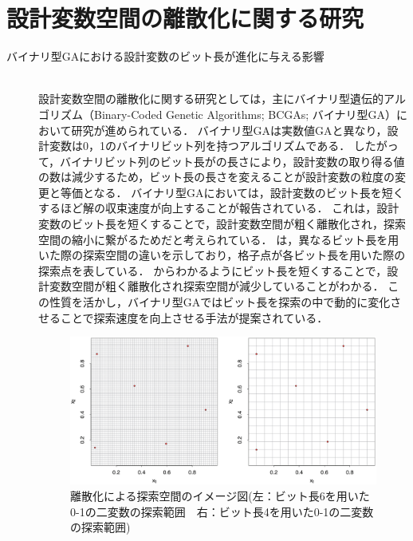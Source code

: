 \documentclass[../main/main]{subfiles}
\begin{document}
\section{設計変数空間の離散化に関する研究}
%
%
\begin{description}
\item[バイナリ型GAにおける設計変数のビット長が進化に与える影響]\mbox{}\\
\quad 設計変数空間の離散化に関する研究としては，主にバイナリ型遺伝的アルゴリズム（Binary-Coded Genetic Algorithms; BCGAs; バイナリ型GA）において研究が進められている．
バイナリ型GAは実数値GAと異なり，設計変数は0，1のバイナリビット列を持つアルゴリズムである．
したがって，バイナリビット列のビット長がの長さにより，設計変数の取り得る値の数は減少するため，ビット長の長さを変えることが設計変数の粒度の変更と等価となる．
バイナリ型GAにおいては，設計変数のビット長を短くするほど解の収束速度が向上することが報告されている\cite{Jaimes2005MRMOGA}．
これは，設計変数のビット長を短くすることで，設計変数空間が粗く離散化され，探索空間の縮小に繋がるためだと考えられている．
は，異なるビット長を用いた際の探索空間の違いを示しており，格子点が各ビット長を用いた際の探索点を表している．
からわかるようにビット長を短くすることで，設計変数空間が粗く離散化され探索空間が減少していることがわかる．
この性質を活かし，バイナリ型GAではビット長を探索の中で動的に変化させることで探索速度を向上させる手法が提案されている．

\begin{figure}[htbp]
\begin{center}
\includegraphics[width=0.9\linewidth]{../figures/discretization_sample.eps}
\end{center}
\caption[離散化による探索空間のイメージ図]{離散化による探索空間のイメージ図(左：ビット長6を用いた0-1の二変数の探索範囲　右：ビット長4を用いた0-1の二変数の探索範囲)}
\label{discretization_sample}
\end{figure}


\end{description}
\end{document}
